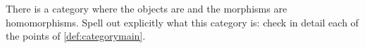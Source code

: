 
\vfill
\begin{gradedexercise}
    There is a category where the objects are  and the morphisms are  homomorphisms.
    Spell out explicitly what this category is: check in detail each of the points of \cref{def:categorymain}.
\end{gradedexercise}


